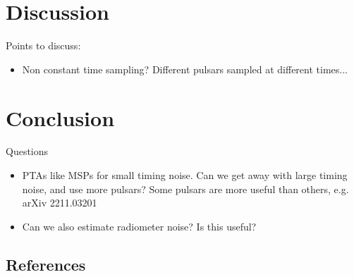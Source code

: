 \documentclass[fleqn,usenatbib,useAMS]{mnras}
\begin{document}
\section{Discussion}

Points to discuss:

\begin{itemize}
	\item Non constant time sampling? Different pulsars sampled at different times...
\end{itemize}

\section{Conclusion}

Questions 

\begin{itemize}
	\item PTAs like MSPs for small timing noise. Can we get away with large timing noise, and use more pulsars? Some pulsars are more useful than others, e.g. arXiv 2211.03201
	\item Can we also estimate radiometer noise? Is this useful?
\end{itemize}




\subsection{References}
\label{sec:ref_list}













\bsp	%
\label{lastpage}
\end{document}
